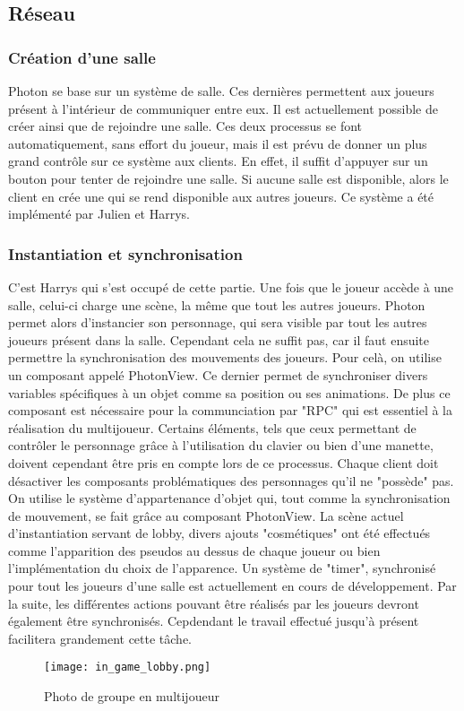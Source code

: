 \subsection{Réseau}

    \subsubsection{Création d'une salle}
        Photon se base sur un système de salle. Ces dernières permettent aux joueurs présent à l'intérieur de communiquer entre eux. Il est actuellement possible de créer ainsi que de rejoindre une salle. Ces deux processus se font automatiquement, sans effort du joueur, mais il est prévu de donner un plus grand contrôle sur ce système aux clients. En effet, il suffit d'appuyer sur un bouton pour tenter de rejoindre une salle. Si aucune salle est disponible, alors le client en crée une qui se rend disponible aux autres joueurs. Ce système a été implémenté par Julien et Harrys.
    \subsubsection{Instantiation et synchronisation}
        C'est Harrys qui s'est occupé de cette partie. Une fois que le joueur accède à une salle, celui-ci charge une scène, la même que tout les autres joueurs. Photon permet alors d'instancier son personnage, qui sera visible par tout les autres joueurs présent dans la salle.
        Cependant cela ne suffit pas, car il faut ensuite permettre la synchronisation des mouvements des joueurs. Pour celà, on utilise un composant appelé PhotonView. Ce dernier permet de synchroniser divers variables spécifiques à un objet comme sa position ou ses animations. De plus ce composant est nécessaire pour la communciation par "RPC" qui est essentiel à la réalisation du multijoueur.
        Certains éléments, tels que ceux permettant de contrôler le personnage grâce à l'utilisation du clavier ou bien d'une manette, doivent cependant être pris en compte lors de ce processus. Chaque client doit désactiver les composants problématiques des personnages qu'il ne "possède" pas. On utilise le système d'appartenance d'objet qui, tout comme la synchronisation de mouvement, se fait grâce au composant PhotonView.
        La scène actuel d'instantiation servant de lobby, divers ajouts "cosmétiques" ont été effectués comme l'apparition des pseudos au dessus de chaque joueur ou bien l'implémentation du choix de l'apparence.
        Un système de "timer", synchronisé pour tout les joueurs d'une salle est actuellement en cours de développement.
        Par la suite, les différentes actions pouvant être réalisés par les joueurs devront également être synchronisés. Cepdendant le travail effectué jusqu'à présent facilitera grandement cette tâche.
        
        \begin{figure}[!hbt]
                \centering \texttt{[image: in\_game\_lobby.png]} 
                \caption{Photo de groupe en multijoueur}
            \end{figure}